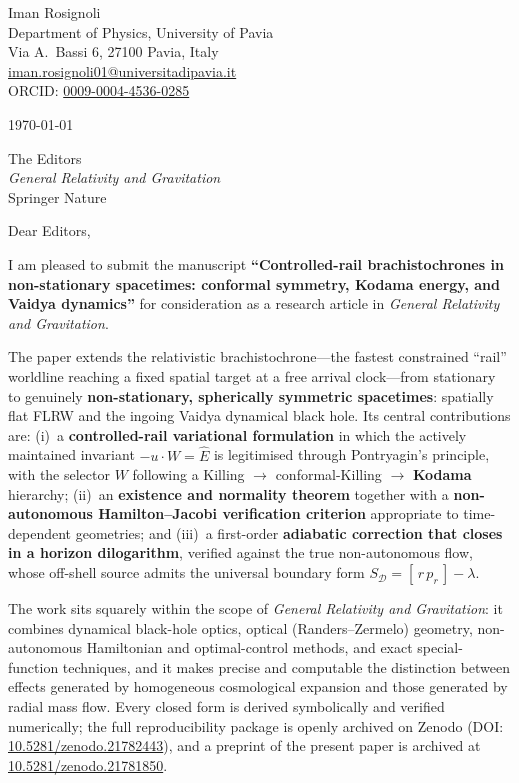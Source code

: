 \documentclass[11pt]{article}
\begin{document}
\thispagestyle{empty}

\noindent
Iman Rosignoli\\
Department of Physics, University of Pavia\\
Via A.\ Bassi 6, 27100 Pavia, Italy\\
\href{mailto:iman.rosignoli01@universitadipavia.it}{iman.rosignoli01@universitadipavia.it}\\
ORCID: \href{https://orcid.org/0009-0004-4536-0285}{0009-0004-4536-0285}

\vspace{0.6em}
\noindent\today

\vspace{0.6em}
\noindent
The Editors\\
\emph{General Relativity and Gravitation}\\
Springer Nature

\vspace{0.6em}
\noindent Dear Editors,

\vspace{0.5em}
I am pleased to submit the manuscript \textbf{``Controlled-rail brachistochrones in
non-stationary spacetimes: conformal symmetry, Kodama energy, and Vaidya dynamics''} for
consideration as a research article in \emph{General Relativity and Gravitation}.

The paper extends the relativistic brachistochrone---the fastest constrained ``rail''
worldline reaching a fixed spatial target at a free arrival clock---from stationary to
genuinely \textbf{non-stationary, spherically symmetric spacetimes}: spatially flat FLRW
and the ingoing Vaidya dynamical black hole. Its central contributions are: (i)~a
\textbf{controlled-rail variational formulation} in which the actively maintained
invariant $-u\cdot W=\hat E$ is legitimised through Pontryagin's principle, with the
selector $W$ following a Killing $\to$ conformal-Killing $\to$ \textbf{Kodama} hierarchy;
(ii)~an \textbf{existence and normality theorem} together with a \textbf{non-autonomous
Hamilton--Jacobi verification criterion} appropriate to time-dependent geometries; and
(iii)~a first-order \textbf{adiabatic correction that closes in a horizon dilogarithm},
verified against the true non-autonomous flow, whose off-shell source admits the universal
boundary form $S_{\mathcal D}=[\,r\,p_r\,]-\lambda$.

The work sits squarely within the scope of \emph{General Relativity and Gravitation}: it
combines dynamical black-hole optics, optical (Randers--Zermelo) geometry, non-autonomous
Hamiltonian and optimal-control methods, and exact special-function techniques, and it
makes precise and computable the distinction between effects generated by homogeneous
cosmological expansion and those generated by radial mass flow. Every closed form is
derived symbolically and verified numerically; the full reproducibility package is openly
archived on Zenodo
(DOI: \href{https://doi.org/10.5281/zenodo.21782443}{10.5281/zenodo.21782443}), and a
preprint of the present paper is archived at
\href{https://doi.org/10.5281/zenodo.21781850}{10.5281/zenodo.21781850}.
\end{document}
